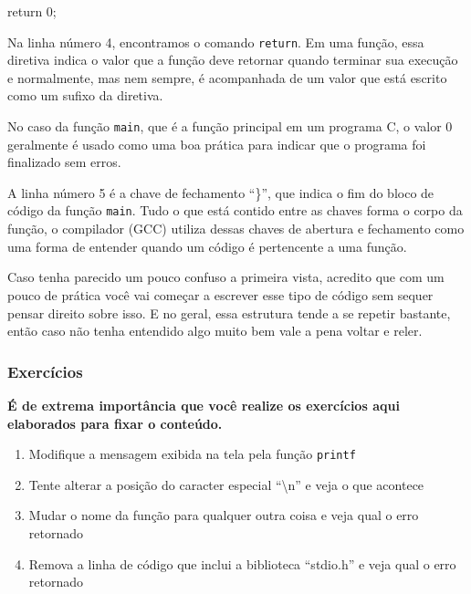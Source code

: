 \begin{excode}
    return 0;
\end{excode}

Na linha número 4, encontramos o comando \texttt{return}. Em uma função, essa 
diretiva indica o valor que a função deve retornar quando terminar sua 
execução e normalmente, mas nem sempre, é acompanhada de um valor que está 
escrito como um sufixo da diretiva. 

No caso da função \texttt{main}, que é a função principal em um programa C, o 
valor 0 geralmente é usado como uma boa prática para indicar que o programa 
foi finalizado sem erros.

\begin{excode}
    }
\end{excode}

A linha número 5 é a chave de fechamento ``\}'', que indica o fim do bloco de 
código da função \texttt{main}. Tudo o que está contido entre as chaves forma o 
corpo da função, o compilador (GCC) utiliza dessas chaves de abertura e 
fechamento como uma forma de entender quando um código é pertencente a uma 
função.

Caso tenha parecido um pouco confuso a primeira vista, acredito que com um 
pouco de prática você vai começar a escrever esse tipo de código sem sequer 
pensar direito sobre isso. E no geral, essa estrutura tende a se repetir 
bastante, então caso não tenha entendido algo muito bem vale a pena voltar e 
reler.

\subsubsection{Exercícios}

\textbf{É de extrema importância que você realize os exercícios aqui 
elaborados para fixar o conteúdo.}

\begin{enumerate}
    \item{Modifique a mensagem exibida na tela pela função \texttt{printf}}
    \item{Tente alterar a posição do caracter especial ``\textbackslash n'' e 
        veja o que acontece}
    \item{Mudar o nome da função para qualquer outra coisa e veja qual o erro 
        retornado}
    \item{Remova a linha de código que inclui a biblioteca ``stdio.h'' e veja 
        qual o erro retornado}
\end{enumerate}

